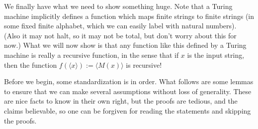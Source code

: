 \par We finally have what we need to show something huge. Note that a Turing machine implicitly defines a function which maps finite strings to finite strings (in some fixed finite alphabet, which we can easily label with natural numbers). (Also it may not halt, so it may not be total, but don't worry about this for now.) What we will now show is that any function like this defined by a Turing machine is really a recursive function, in the sense that if $x$ is the input string, then the function $f(\langle x \rangle) := \langle M(x) \rangle$ is recursive!
\par Before we begin, some standardization is in order. What follows are some lemmas to ensure that we can make several assumptions without loss of generality. These are nice facts to know in their own right, but the proofs are tedious, and the claims believable, so one can be forgiven for reading the statements and skipping the proofs. 

